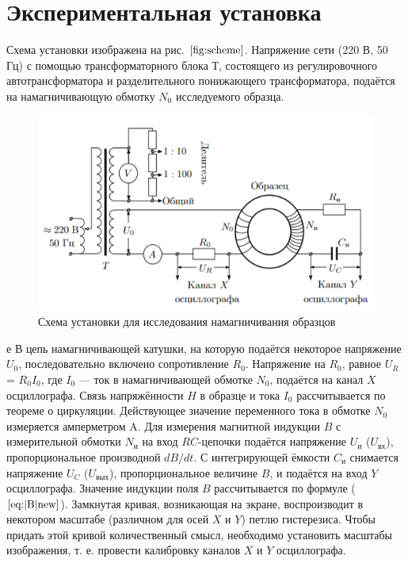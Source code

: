 \documentclass[12pt,a4paper]{article}
\begin{document}
\section{Экспериментальная установка}

Схема установки изображена на рис. $\ref{fig:scheme}$. Напряжение сети (220 В,
50 Гц) с помощью трансформаторного блока Т, состоящего из регулировочного автотрансформатора и разделительного понижающего трансформатора, подаётся на намагничивающую обмотку $N_0$ исследуемого образца.
\begin{figure}[h]
	\centering
	\includegraphics[scale=0.7]{scheme.png}
	\caption{ Схема установки для исследования намагничивания образцов}
	\label{fig:scheme}
\end{figure}
е
В цепь намагничивающей катушки, на которую подаётся некоторое
напряжение $U_0$, последовательно включено сопротивление $R_0$. Напряжение на $R_0$, равное $U_R$= $R_0I_0$, где $I_0$ — ток в намагничивающей обмотке $N_0$, подаётся на канал $ X $ осциллографа. Связь напряжённости $ H $ в
образце и тока $I_0$ рассчитывается по теореме о циркуляции. 
Действующее значение переменного тока в обмотке $N_0$ измеряется амперметром A.
Для измерения магнитной индукции $ B $ с измерительной обмотки $N_\text{и}$
на вход $ RC $-цепочки подаётся напряжение $U_\text{и}$ ($U_{\text{вх}}$), пропорциональное
производной $ dB/dt $. С интегрирующей ёмкости $C_\text{и}$ снимается напряжение $U_C$ ($U_{\text{вых}}$), пропорциональное величине $ B $, и подаётся на вход $ Y $
осциллографа. Значение индукции поля $ B $ рассчитывается по формуле ($\ref{eq:|B|new}$).
Замкнутая кривая, возникающая на экране, воспроизводит в некотором масштабе (различном для осей $ X $ и $ Y $) петлю гистерезиса. Чтобы придать этой кривой количественный смысл, необходимо установить
масштабы изображения, т. е. провести калибровку каналов $ X $ и $ Y $ осциллографа.
\end{document}
